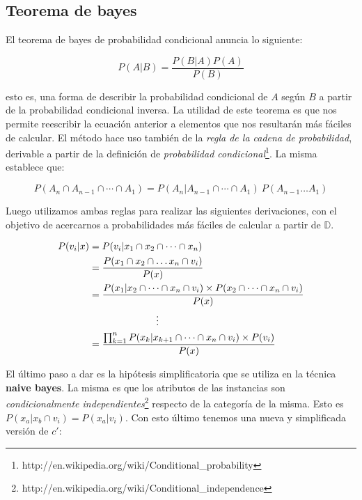 \documentclass[a4paper,10pt]{article}
\begin{document}
\subsection{Teorema de bayes}

El teorema de bayes de probabilidad condicional anuncia lo siguiente:

\begin{equation}\label{eq_bayes}
P(A | B) = \frac{P(B | A) P(A)}{P(B)}
\end{equation}

esto es, una forma de describir la probabilidad condicional de $A$ según $B$ a partir de la probabilidad condicional inversa. La utilidad de este teorema es que nos permite reescribir la ecuación anterior a elementos que nos resultarán más fáciles de calcular. El método hace uso también de la \emph{regla de la cadena de probabilidad}, derivable a partir de la definición de \emph{probabilidad condicional}\footnote{http://en.wikipedia.org/wiki/Conditional\_probability}. La misma establece que:

\begin{equation}\label{eq_chain}
P(A_n \cap A_{n-1} \cap \cdots \cap A_1) = P(A_n | A_{n-1} \cap \cdots \cap A_1) \  P(A_{n-1} \dots A_1)
\end{equation}

Luego utilizamos ambas reglas para realizar las siguientes derivaciones, con el objetivo de acercarnos a probabilidades más fáciles de calcular a partir de $\mathbb{D}$.

\begin{align}
P(v_i | x) &= P(v_i | x_1 \cap x_2 \cap \dots \cap x_n) \\
 &= \frac{P(x_1 \cap x_2 \cap \dots x_n \cap v_i)}{P(x)} \\
 &= \frac{P(x_1 | x_2 \cap \dots \cap x_n \cap v_i) \times P(x_2 \cap \dots \cap x_n \cap v_i) }{P(x)}  \\
  &\hspace{0.2\textwidth} {} \vdots \\
 &= \frac{\prod^{n}_{k=1} P(x_k | x_{k+1} \cap \dots \cap x_n \cap v_i) \times P(v_i) }{P(x)} 
\end{align}

El último paso a dar es la hipótesis simplificatoria que se utiliza en la técnica \textbf{naive bayes}. La misma es que los atributos de las instancias son \emph{condicionalmente independientes}\footnote{http://en.wikipedia.org/wiki/Conditional\_independence} respecto de la categoría de la misma. Esto es $P(x_a | x_b \cap v_i) = P(x_a | v_i)$. Con esto último tenemos una nueva y simplificada versión de $c'$:
\end{document}
